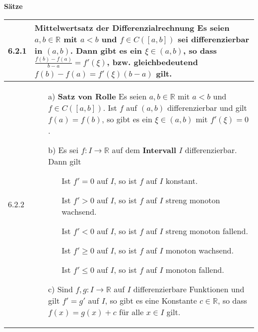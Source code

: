     \noindent 
    \textbf{Sätze}
    \begin{table}[H]
    \begin{tabularx}{\textwidth}{X m{16cm}}
        \toprule

        6.2.1 & \textbf{Mittelwertsatz der Differenzialrechnung} \hfill \break
                Es seien $a,b \in \mathbb{R}$ mit $a < b$ und $f \in C([a,b])$ sei differenzierbar in $(a,b)$. Dann gibt es ein
                $\xi \in (a,b)$, so dass $\frac{f(b)-f(a)}{b-a} = f'(\xi)$, bzw. gleichbedeutend $f(b) - f(a) = f'(\xi)(b-a)$ gilt. \\
        \midrule
        6.2.2 & \begin{itemize}[topsep=-0.5cm]
                    \item[a)] \textbf{Satz von Rolle} \hfill \break
                                Es seien $a, b \in \mathbb{R}$ mit $a < b$ und $f \in C([a,b])$. Ist $f$ auf $(a,b)$ differenzierbar
                                und gilt $f(a) = f(b)$, so gibt es ein $\xi \in (a,b)$ mit $f'(\xi) = 0$.
                    \item[b)] Es sei $f: I \rightarrow \mathbb{R}$ auf dem \textbf{Intervall} $I$ differenzierbar. Dann gilt
                                \begin{itemize}[topsep=-0.5cm]
                                    \item[] Ist $f' = 0$ auf $I$, so ist $f$ auf $I$ konstant.
                                    \item[] Ist $f' > 0$ auf $I$, so ist $f$ auf $I$ streng monoton wachsend.
                                    \item[] Ist $f' < 0$ auf $I$, so ist $f$ auf $I$ streng monoton fallend.
                                    \item[] Ist $f' \geq 0$ auf $I$, so ist $f$ auf $I$ monoton wachsend.
                                    \item[] Ist $f' \leq 0$ auf $I$, so ist $f$ auf $I$ monoton fallend.
                                \end{itemize}
                    \item[c)] Sind $f,g : I \rightarrow \mathbb{R}$ auf $I$ differenzierbare Funktionen und gilt $f' = g'$ auf $I$,
                                so gibt es eine Konstante $c \in \mathbb{R}$, so dass $f(x) = g(x) + c$ für alle $x \in I$ gilt.
                \end{itemize} \vspace{-0cm} \\

\end{tabularx}
\end{table}
